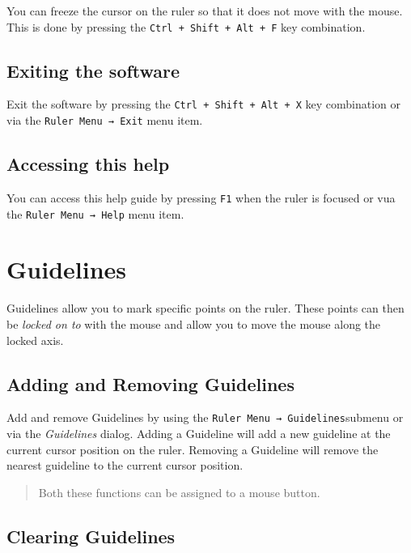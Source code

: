 \documentclass[
]{book}
\begin{document}
You can freeze the cursor on the ruler so that it does not move with the mouse.
This is done by pressing the \texttt{Ctrl\ +\ Shift\ +\ Alt\ +\ F} key combination.

\hypertarget{exit}{%
\section{Exiting the software}\label{exit}}

Exit the software by pressing the \texttt{Ctrl\ +\ Shift\ +\ Alt\ +\ X} key combination or via the \texttt{Ruler\ Menu\ →\ Exit} menu item.

\hypertarget{help}{%
\section{Accessing this help}\label{help}}

You can access this help guide by pressing \texttt{F1} when the ruler is focused or vua the \texttt{Ruler\ Menu\ →\ Help} menu item.

\hypertarget{guidelines}{%
\chapter{Guidelines}\label{guidelines}}

Guidelines allow you to mark specific points on the ruler.
These points can then be \emph{locked on to} with the mouse and allow you to move the mouse along the locked axis.

\hypertarget{adding-and-removing-guidelines}{%
\section{Adding and Removing Guidelines}\label{adding-and-removing-guidelines}}

Add and remove Guidelines by using the \texttt{Ruler\ Menu\ →\ Guidelines}submenu or via the \emph{Guidelines} dialog.
Adding a Guideline will add a new guideline at the current cursor position on the ruler.
Removing a Guideline will remove the nearest guideline to the current cursor position.

\begin{quote}
Both these functions can be assigned to a mouse button.
\end{quote}

\hypertarget{clearing-guidelines}{%
\section{Clearing Guidelines}\label{clearing-guidelines}}
\end{document}
